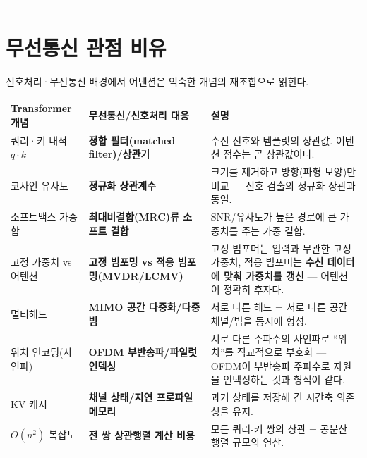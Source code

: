 \documentclass[
  korean,
]{article}
\newcounter{none} %
\begin{document}
\begin{center}\rule{0.5\linewidth}{0.5pt}\end{center}

\section{무선통신 관점 비유}\label{sec-wireless}

신호처리·무선통신 배경에서 어텐션은 익숙한 개념의 재조합으로 읽힌다.

{\def\LTcaptype{none} %
\begin{longtable}[]{@{}
  >{\raggedright\arraybackslash}p{}
  >{\raggedright\arraybackslash}p{}
  >{\raggedright\arraybackslash}p{}@{}}
\toprule\noalign{}
\begin{minipage}[b]{\linewidth}\raggedright
Transformer 개념
\end{minipage} & \begin{minipage}[b]{\linewidth}\raggedright
무선통신/신호처리 대응
\end{minipage} & \begin{minipage}[b]{\linewidth}\raggedright
설명
\end{minipage} \\
\midrule\noalign{}
\endhead
\bottomrule\noalign{}
\endlastfoot
쿼리·키 내적 \(q\cdot k\) & \textbf{정합 필터(matched filter)/상관기} &
수신 신호와 템플릿의 상관값. 어텐션 점수는 곧 상관값이다. \\
코사인 유사도 & \textbf{정규화 상관계수} & 크기를 제거하고 방향(파형
모양)만 비교 --- 신호 검출의 정규화 상관과 동일. \\
소프트맥스 가중합 & \textbf{최대비결합(MRC)류 소프트 결합} &
SNR/유사도가 높은 경로에 큰 가중치를 주는 가중 결합. \\
고정 가중치 vs 어텐션 & \textbf{고정 빔포밍 vs 적응 빔포밍(MVDR/LCMV)} &
고정 빔포머는 입력과 무관한 고정 가중치, 적응 빔포머는 \textbf{수신
데이터에 맞춰 가중치를 갱신} --- 어텐션이 정확히 후자다. \\
멀티헤드 & \textbf{MIMO 공간 다중화/다중 빔} & 서로 다른 헤드 = 서로
다른 공간 채널/빔을 동시에 형성. \\
위치 인코딩(사인파) & \textbf{OFDM 부반송파/파일럿 인덱싱} & 서로 다른
주파수의 사인파로 ``위치''를 직교적으로 부호화 --- OFDM이 부반송파
주파수로 자원을 인덱싱하는 것과 형식이 같다. \\
KV 캐시 & \textbf{채널 상태/지연 프로파일 메모리} & 과거 상태를 저장해
긴 시간축 의존성을 유지. \\
\(O(n^2)\) 복잡도 & \textbf{전 쌍 상관행렬 계산 비용} & 모든 쿼리-키
쌍의 상관 = 공분산 행렬 규모의 연산. \\
\end{longtable}
}
\end{document}
